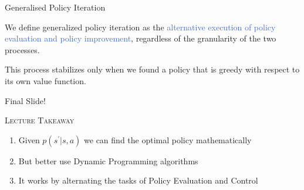 \documentclass{beamer}
\newenvironment{takeaway}[1]{%
	\definecolor{shadecolor}{gray}{0.9}%
		\begin{shaded}{\color{skymagenta}\noindent\textsc{#1}}\\%
		}{%
		\end{shaded}%
}
\begin{document}
\begin{frame}{Generalised Policy Iteration}

We define generalized policy iteration as the \textcolor{RoyalBlue}{alternative execution of policy evaluation and policy improvement}, regardless of the granularity of the two processes.

\hspace{2mm}

This process stabilizes only when we found a policy that is greedy with respect to its own value function.

\end{frame}


\begin{frame}{Final Slide!}
	\begin{takeaway}{Lecture Takeaway}
		\begin{enumerate}
			\item Given $p(s^{\prime}|s,a)$ we can find the optimal policy mathematically
			\item But better use Dynamic Programming algorithms
			\item It works by alternating the tasks of Policy Evaluation and Control
		\end{enumerate}
	\end{takeaway}
\end{frame}
\end{document}
